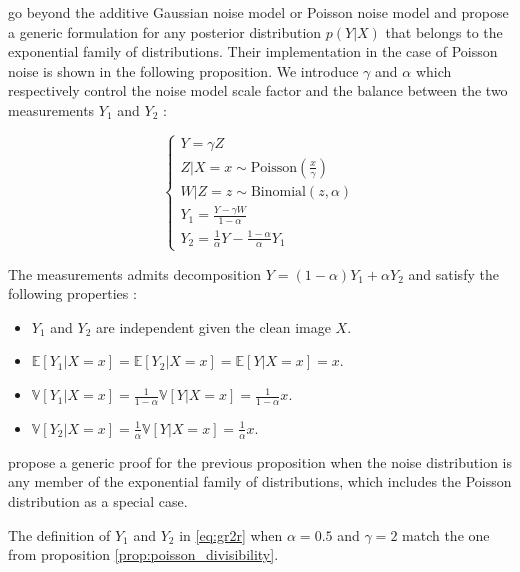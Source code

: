 \cite{gr2r} go beyond the additive Gaussian noise model or Poisson noise model and propose a generic formulation for any posterior distribution $p(Y|X)$ that belongs to the exponential family of distributions.
Their implementation in the case of Poisson noise is shown in the following proposition.
We introduce $\gamma$ and $\alpha$ which respectively control the noise model scale factor and the balance between the two measurements $Y_1$ and $Y_2$ :

\begin{equation}
    \begin{cases}
        Y = \gamma Z \\
        Z | X =x \sim \text{Poisson}(\frac{x}{\gamma}) \\
        W | Z = z \sim \text{Binomial}(z, \alpha) \\
        Y_1 = \frac{Y - \gamma W}{1 - \alpha} \\
        Y_2 = \frac{1}{\alpha} Y - \frac{1 - \alpha}{\alpha} Y_1
    \end{cases}
    \label{eq:gr2r}
\end{equation}

\begin{proposition}
    The measurements admits decomposition $Y = (1 - \alpha) Y_1 + \alpha Y_2$ and satisfy the following properties :
    \begin{itemize}
        \item $Y_1$ and $Y_2$ are independent given the clean image $X$.
        \item $\mathbb{E}[Y_1 | X=x] = \mathbb{E}[Y_2 | X=x] = \mathbb{E}[Y | X=x] = x$.
        \item $\mathbb{V}[Y_1 | X=x] = \frac{1}{1 - \alpha} \mathbb{V}[Y | X=x] = \frac{1}{1 - \alpha} x$.
        \item $\mathbb{V}[Y_2 | X=x] = \frac{1}{\alpha} \mathbb{V}[Y | X=x] = \frac{1}{\alpha} x$.
    \end{itemize}
\end{proposition}

\cite{gr2r} propose a generic proof for the previous proposition when the noise distribution is any member of the exponential family of distributions, which includes the Poisson distribution as a special case.

\begin{remark}
    The definition of $Y_1$ and $Y_2$ in \eqref{eq:gr2r} when $\alpha = 0.5$ and $\gamma = 2$ match the one from proposition \ref{prop:poisson_divisibility}.
\end{remark}


